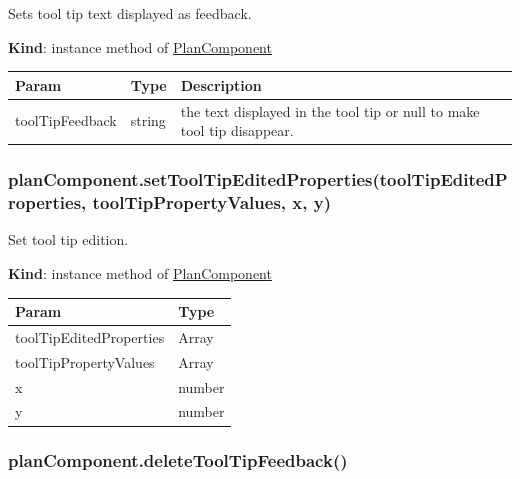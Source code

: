 \documentclass[a4paper]{report}
\begin{document}
Sets tool tip text displayed as feedback.

\textbf{Kind}: instance method of
\protect\hyperlink{PlanComponent}{PlanComponent}

\begin{longtable}[]{@{}lll@{}}
\toprule
\begin{minipage}[b]{0.30\columnwidth}\raggedright
Param\strut
\end{minipage} & \begin{minipage}[b]{0.30\columnwidth}\raggedright
Type\strut
\end{minipage} & \begin{minipage}[b]{0.30\columnwidth}\raggedright
Description\strut
\end{minipage}\tabularnewline
\midrule
\endhead
\begin{minipage}[t]{0.30\columnwidth}\raggedright
toolTipFeedback\strut
\end{minipage} & \begin{minipage}[t]{0.30\columnwidth}\raggedright
string\strut
\end{minipage} & \begin{minipage}[t]{0.30\columnwidth}\raggedright
the text displayed in the tool tip or null to make tool tip
disappear.\strut
\end{minipage}\tabularnewline
\bottomrule
\end{longtable}

\hypertarget{plancomponent.settooltipeditedpropertiestooltipeditedproperties-tooltippropertyvalues-x-y}{%
\subsubsection{planComponent.setToolTipEditedProperties(toolTipEditedProperties,
toolTipPropertyValues, x,
y)}\label{plancomponent.settooltipeditedpropertiestooltipeditedproperties-tooltippropertyvalues-x-y}}

Set tool tip edition.

\textbf{Kind}: instance method of
\protect\hyperlink{PlanComponent}{PlanComponent}

\begin{longtable}[]{@{}ll@{}}
\toprule
Param & Type\tabularnewline
\midrule
\endhead
toolTipEditedProperties & Array\tabularnewline
toolTipPropertyValues & Array\tabularnewline
x & number\tabularnewline
y & number\tabularnewline
\bottomrule
\end{longtable}

\hypertarget{plancomponent.deletetooltipfeedback}{%
\subsubsection{planComponent.deleteToolTipFeedback()}\label{plancomponent.deletetooltipfeedback}}
\end{document}
